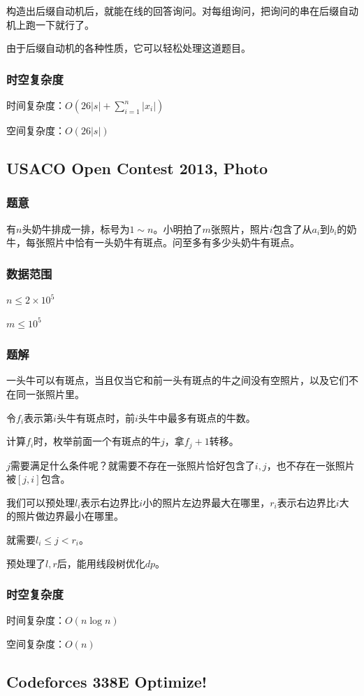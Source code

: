 \documentclass{ctexart}
\begin{document}
构造出后缀自动机后，就能在线的回答询问。对每组询问，把询问的串在后缀自动机上跑一下就行了。

由于后缀自动机的各种性质，它可以轻松处理这道题目。
\subsubsection{时空复杂度}
时间复杂度：$O(26|s|+\sum\limits_{i=1}^n |x_i|)$

空间复杂度：$O(26|s|)$
\subsection{USACO Open Contest 2013, Photo}
\subsubsection{题意}
有$n$头奶牛排成一排，标号为$1 \sim n$。小明拍了$m$张照片，照片$i$包含了从$a_i$到$b_i$的奶牛，每张照片中恰有一头奶牛有斑点。问至多有多少头奶牛有斑点。
\subsubsection{数据范围}
$n \le 2 \times 10^5$

$m \le 10^5$
\subsubsection{题解}
一头牛可以有斑点，当且仅当它和前一头有斑点的牛之间没有空照片，以及它们不在同一张照片里。

令$f_i$表示第$i$头牛有斑点时，前$i$头牛中最多有斑点的牛数。

计算$f_i$时，枚举前面一个有斑点的牛$j$，拿$f_j+1$转移。

$j$需要满足什么条件呢？就需要不存在一张照片恰好包含了$i,j$，也不存在一张照片被$[j,i]$包含。

我们可以预处理$l_i$表示右边界比$i$小的照片左边界最大在哪里，$r_i$表示右边界比$i$大的照片做边界最小在哪里。

就需要$l_i \le j < r_i$。

预处理了$l,r$后，能用线段树优化$dp$。
\subsubsection{时空复杂度}
时间复杂度：$O(n \log n)$

空间复杂度：$O(n)$
\subsection{Codeforces 338E Optimize!}
\end{document}

